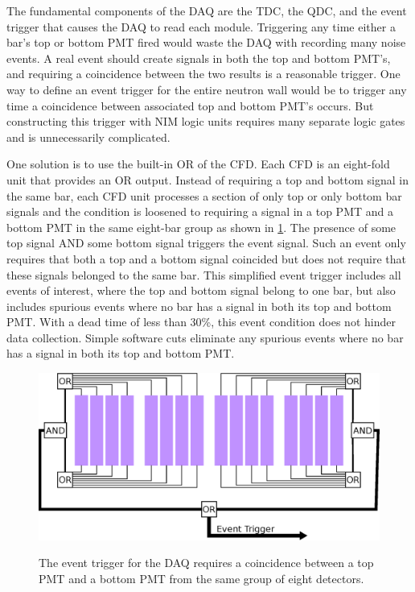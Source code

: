 The fundamental components of the DAQ are the TDC, the QDC, and the event trigger that causes the DAQ to read each module.  Triggering any time either a bar's top or bottom PMT fired would waste the DAQ with recording many noise events.  A real event should create signals in both the top and bottom PMT's, and requiring a coincidence between the two results is a reasonable trigger.  One way to define an event trigger for the entire neutron wall would be to trigger any time a coincidence between associated top and bottom PMT's occurs.  But constructing this trigger with NIM logic units requires many separate logic gates and is unnecessarily complicated.  

One solution is to use the built-in OR of the CFD.  Each CFD is an eight-fold unit that provides an OR output.  Instead of requiring a top and bottom signal in the same bar, each CFD unit processes a section of only top or only bottom bar signals and the condition is loosened to requiring a signal in a top PMT and a bottom PMT in the same eight-bar group as shown in \ref{fig:eventTrig}.  The presence of some top signal AND some bottom signal triggers the event signal.  Such an event only requires that both a top and a bottom signal coincided but does not require that these signals belonged to the same bar.  This simplified event trigger includes all events of interest, where the top and bottom signal belong to one bar, but also includes spurious events where no bar has a signal in both its top and bottom PMT.  With a dead time of less than 30\%, this event condition does not hinder data collection.  Simple software cuts eliminate any spurious events where no bar has a signal in both its top and bottom PMT.

\begin{figure}[htp]
\centering
\includegraphics[width=1.0\textwidth]{figures/event_trigger.eps}
\label{fig:eventTrig}
\caption{The event trigger for the DAQ requires a coincidence between a top PMT and a bottom PMT from the same group of eight detectors.}
\end{figure}


